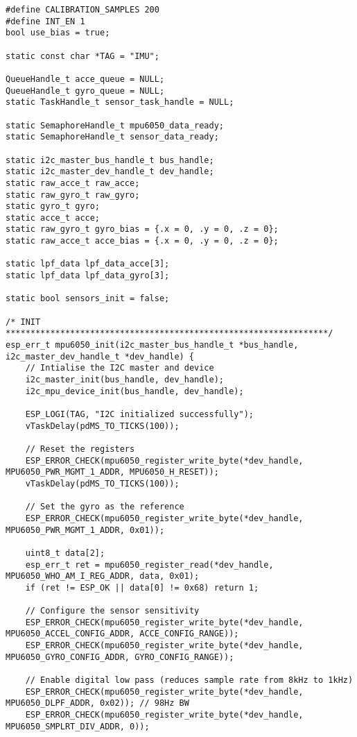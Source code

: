 \begin{lstlisting}[caption={Register Read}]
#define CALIBRATION_SAMPLES 200
#define INT_EN 1
bool use_bias = true;

static const char *TAG = "IMU";

QueueHandle_t acce_queue = NULL;
QueueHandle_t gyro_queue = NULL;
static TaskHandle_t sensor_task_handle = NULL;

static SemaphoreHandle_t mpu6050_data_ready;
static SemaphoreHandle_t sensor_data_ready;

static i2c_master_bus_handle_t bus_handle;
static i2c_master_dev_handle_t dev_handle;
static raw_acce_t raw_acce; 
static raw_gyro_t raw_gyro;
static gyro_t gyro;
static acce_t acce;
static raw_gyro_t gyro_bias = {.x = 0, .y = 0, .z = 0};
static raw_acce_t acce_bias = {.x = 0, .y = 0, .z = 0};

static lpf_data lpf_data_acce[3];
static lpf_data lpf_data_gyro[3];

static bool sensors_init = false;

/* INIT *****************************************************************/
esp_err_t mpu6050_init(i2c_master_bus_handle_t *bus_handle, i2c_master_dev_handle_t *dev_handle) {
    // Intialise the I2C master and device
    i2c_master_init(bus_handle, dev_handle);
    i2c_mpu_device_init(bus_handle, dev_handle);

    ESP_LOGI(TAG, "I2C initialized successfully");
    vTaskDelay(pdMS_TO_TICKS(100)); 
    
    // Reset the registers
    ESP_ERROR_CHECK(mpu6050_register_write_byte(*dev_handle, MPU6050_PWR_MGMT_1_ADDR, MPU6050_H_RESET));
    vTaskDelay(pdMS_TO_TICKS(100)); 
    
    // Set the gyro as the reference
    ESP_ERROR_CHECK(mpu6050_register_write_byte(*dev_handle, MPU6050_PWR_MGMT_1_ADDR, 0x01));

    uint8_t data[2];
    esp_err_t ret = mpu6050_register_read(*dev_handle, MPU6050_WHO_AM_I_REG_ADDR, data, 0x01);
    if (ret != ESP_OK || data[0] != 0x68) return 1;
        
    // Configure the sensor sensitivity
    ESP_ERROR_CHECK(mpu6050_register_write_byte(*dev_handle, MPU6050_ACCEL_CONFIG_ADDR, ACCE_CONFIG_RANGE));
    ESP_ERROR_CHECK(mpu6050_register_write_byte(*dev_handle, MPU6050_GYRO_CONFIG_ADDR, GYRO_CONFIG_RANGE));

    // Enable digital low pass (reduces sample rate from 8kHz to 1kHz)
    ESP_ERROR_CHECK(mpu6050_register_write_byte(*dev_handle, MPU6050_DLPF_ADDR, 0x02)); // 98Hz BW
    ESP_ERROR_CHECK(mpu6050_register_write_byte(*dev_handle, MPU6050_SMPLRT_DIV_ADDR, 0));


\end{lstlisting}

